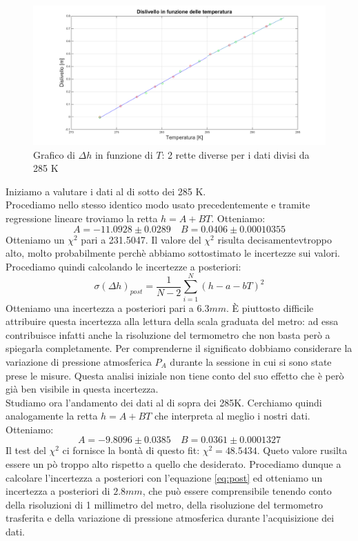 \begin{figure}[H]
\centering
\includegraphics[width=\textwidth]{img/2}
\caption{Grafico di $\Delta h$ in funzione di $T$: 2 rette diverse per i dati divisi da 285 K}
\end{figure}

Iniziamo a valutare i dati al di sotto dei 285 K.\\
Procediamo nello stesso identico modo usato precedentemente e tramite regressione lineare troviamo la retta $h = A+BT$.
Otteniamo:
\[A = -11.0928 \pm 0.0289 \quad  B = 0.0406\pm 0.00010355\]
Otteniamo un $\chi^2$ pari a 231.5047. 
Il valore del $\chi^2$ risulta decisamentevtroppo alto, molto probabilmente perchè abbiamo sottostimato le incertezze sui valori.
Procediamo quindi calcolando le incertezze a posteriori:
\begin{equation}
\label{eq:post}
\sigma(\Delta h)_{post} = \frac{1}{N-2}\sum_{i=1}^N(h-a-bT)^2
\end{equation}
Otteniamo una incertezza a posteriori pari a $6.3 mm$. 
È piuttosto difficile attribuire questa incertezza alla lettura della scala graduata del metro: ad essa contribuisce infatti anche la risoluzione del termometro che non basta però a spiegarla completamente. 
Per comprenderne il significato dobbiamo considerare la variazione di pressione atmosferica $P_A$ durante la sessione in cui si sono state prese le misure. 
Questa analisi iniziale non tiene conto del suo effetto che è però già ben visibile in questa incertezza.\\
\newline
Studiamo ora l'andamento dei dati al di sopra dei 285K. 
Cerchiamo quindi analogamente la retta $h = A+BT$ che interpreta al meglio i nostri dati. 
Otteniamo:
\[A = -9.8096 \pm 0.0385 \quad  B = 0.0361 \pm 0.0001327\]
Il test del $\chi^2$ ci fornisce la bontà di questo fit: $\chi^2 = 48.5434$. 
Queto valore rusilta essere un pò troppo alto rispetto a quello che desiderato. 
Procediamo dunque a calcolare l'incertezza a posteriori con l'equazione \eqref{eq:post} ed otteniamo un incertezza a posteriori di $2.8 mm$, che può essere comprensibile tenendo conto della risoluzioni di 1 millimetro del metro, della risoluzione del termometro trasferita e della variazione di pressione atmosferica durante l'acquisizione dei dati.


